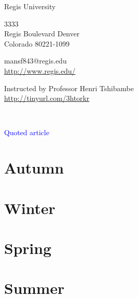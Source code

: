 \documentclass[11pt,a4paper]{scrartcl} %
\begin{document}
\pagecolor{brown!20}
\begin{cv}{}
        \begin{cvlist}{\textcolor{blue}{}}\label{PersDat}  
            \item   Regis University
            \item   3333\\
                    Regis Boulevard Denver \\	
                    Colorado 80221-1099
            \item   mansf843@regis.edu\\				
                    \url{http://www.regis.edu/}				
        \end{cvlist}
        \begin{cvlist}{}\label{irgendwas}
            \item Instructed by  Professor Henri Tshibambe\\
             \url{http://tinyurl.com/3htorkr}
        \end{cvlist}
    \end{cv}
\clearpage

\noindent
\textcolor{green!60!blue!89}{}\\
\textcolor{blue}{}
\begin{verse}

\end{verse}
\textcolor{blue}{Quoted article}~\cite{key here}
\clearpage
\title{\textcolor{green!60!blue!89}{\rmfamily\normalfont{}}}
    \author{\textcolor{blue}{}}
    \date{} %
    
    \maketitle
    
    \begin{abstract}
  
    \end{abstract}
       
    \tableofcontents
    
\section{Autumn}
\section{Winter}
\section{Spring}
\section{Summer}

    \nocite{*}
    
    
\end{document}
